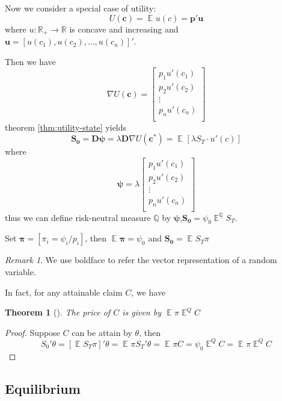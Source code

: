 \documentclass[
  12pt,
  oneside]{book}
\newcommand{\bm}[1]{\symbf{#1}}
\newtheorem{theorem}{Theorem}[chapter]
\theoremstyle{definition}
\theoremstyle{definition}
\theoremstyle{definition}
\theoremstyle{definition}
\theoremstyle{remark}
\newtheorem*{remark}{Remark}
\begin{document}
Now we consider a special case of utility:
\[
U(\bm{c})=\mathop{{}\mathbb{E}}_{}u(c)=\bm{p'u}
\]
where \(u:\mathbb{R}_{+}\to \mathbb{R}\) is concave and increasing and \(\bm{u}=[u(c_1),u(c_2 ),\dots,u(c_n )]'\).

Then we have
\[
\nabla U(\bm{c})=
                \begin{bmatrix}
                     p_1u'(c_1) \\
                     p_2u'(c_2) \\
                     \vdots \\
                     p_nu'(c_n) \\
                 \end{bmatrix}
\]
theorem \ref{thm:utility-state} yields
\[
\bm{S_0}=\bm{D\psi}=\lambda \bm{D} \nabla U(\bm{c}^{*})= \mathop{{}\mathbb{E}}_{} \left[ \lambda S_{T}\cdot u'(c) \right] 
\]
where
\[
\bm{\psi}=\lambda
\begin{bmatrix}
p_1u'(c_1)  \\
p_2u'(c_2)  \\
\vdots \\
p_nu'(c_n)  \\
\end{bmatrix}
\]
thus we can define risk-neutral measure \(\mathbb{Q}\) by \(\bm{\psi}\),\(\bm{S_0}=\psi_0\mathop{{}\mathbb{E}}_{}^{\mathbb{Q}}S_{T}\).

Set \(\bm{\pi}=[\pi_{i}=\psi_{i}/p_{i}]\), then \(\mathop{{}\mathbb{E}}_{}\bm{\pi}=\psi_0\) and \(\bm{S_0}=\mathop{{}\mathbb{E}}_{}S_{T}\pi\)

\begin{remark}
We use boldface to refer the vector representation of a random variable.
\end{remark}

In fact, for any attainable claim \(C\), we have

\begin{theorem}[]
The price of \(C\) is given by \(\mathop{{}\mathbb{E}}_{}\pi \mathop{{}\mathbb{E}}_{}^{Q}C\)
\end{theorem}

\begin{proof}
Suppose \(C\) can be attain by \(\theta\), then
\[
S_0'\theta=[\mathop{{}\mathbb{E}}_{}S_{T}\pi]'\theta=\mathop{{}\mathbb{E}}_{}\pi S_{T}'\theta=\mathop{{}\mathbb{E}}_{}\pi C=\psi_0 \mathop{{}\mathbb{E}}_{}^{Q}C=\mathop{{}\mathbb{E}}_{}\pi\mathop{{}\mathbb{E}}_{}^{Q}C
\]
\end{proof}

\hypertarget{equilibrium}{%
\subsection{Equilibrium}\label{equilibrium}}
\end{document}
